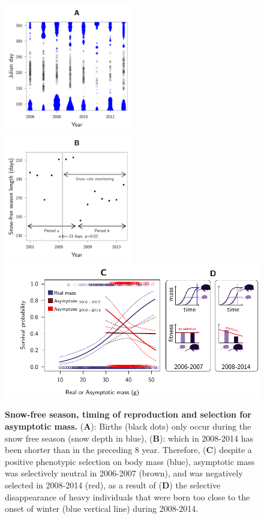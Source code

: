 \begin{figure}[h]
\includegraphics[width=0.5\textwidth]{FiguresStasis/BDsnow-1}
\includegraphics[width=0.5\textwidth]{FiguresStasis/Climatic_trend-1}
\includegraphics[width=1\textwidth]{FiguresStasis/Fig3b}
\caption{\footnotesize \textbf{Snow-free season, timing of reproduction and selection for asymptotic mass.} (\textbf{A}): Births (black dots) only occur during the snow free season (snow depth in blue), (\textbf{B}): which in 2008-2014 has been shorter than in the preceding 8 year. Therefore, (\textbf{C}) despite a positive phenotypic selection on body mass (blue), asymptotic mass was selectively neutral in 2006-2007 (brown), and was negatively selected in 2008-2014 (red), as a result of (\textbf{D}) the selective disappearance of heavy individuals that were born too close to the onset of winter (blue vertical line) during 2008-2014.}
\label{fig:ResA}
\end{figure}

